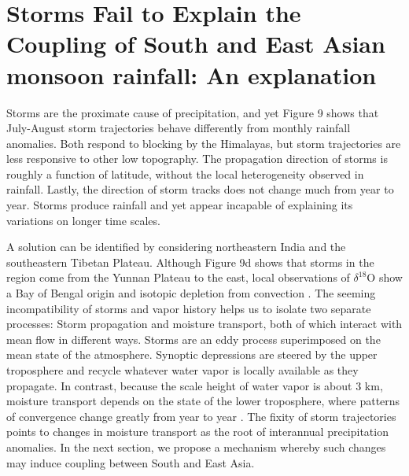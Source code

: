 \section{Storms Fail to Explain the Coupling of South and East Asian monsoon rainfall: An explanation}
	 
	 Storms are the proximate cause of precipitation, and yet Figure 9 shows that July-August storm trajectories behave differently from monthly rainfall anomalies. Both respond to blocking by the Himalayas, but storm trajectories are less responsive to other low topography. The propagation direction of storms is roughly a function of latitude, without the local heterogeneity observed in rainfall. Lastly, the direction of storm tracks does not change much from year to year. Storms produce rainfall and yet appear incapable of explaining its variations on longer time scales.
	 
	 A solution can be identified by considering northeastern India and the southeastern Tibetan Plateau. Although Figure 9d shows that storms in the region come from the Yunnan Plateau to the east, local observations of $\delta^{18}$O show a Bay of Bengal origin and isotopic depletion from convection \parencite{Gao2011}. The seeming incompatibility of storms and vapor history helps us to isolate two separate processes: Storm propagation and moisture transport, both of which interact with mean flow in different ways. Storms are an eddy process superimposed on the mean state of the atmosphere. Synoptic depressions are steered by the upper troposphere and recycle whatever water vapor is locally available as they propagate. In contrast, because the scale height of water vapor is about 3 km, moisture transport depends on the state of the lower troposphere, where patterns of convergence change greatly from year to year \parencite{Annamalai2001,Yoon2005}. The fixity of storm trajectories points to changes in moisture transport as the root of interannual precipitation anomalies. In the next section, we propose a mechanism whereby such changes may induce coupling between South and East Asia.
